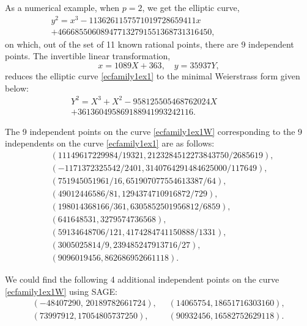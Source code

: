 \documentclass[11pt, leqno]{article}
\begin{document}
As a numerical example, when $p=2$, we get the elliptic curve,
\begin{multline}
y^2=x^3-1136261157571019728659411x\\
+466685506089477132791551368731316450,\quad \quad \quad \quad \quad \quad \label{ecfamily1ex1} 
\end{multline}
on which, out of the set of 11 known rational points,  there are 9 independent points. 
The invertible linear transformation,
\begin{equation}
x = 1089X+363,\quad  y = 35937Y,
\end{equation}
reduces the elliptic curve \eqref{ecfamily1ex1} to the minimal Weierstrass form given below:
\begin{multline}
Y^2=X^3+X^2-958125505468762024X\\
+361360495869188941993242116. \quad \quad \quad \quad \quad \quad  \label{ecfamily1ex1W}
\end{multline}

The 9 independent points on the curve \eqref{ecfamily1ex1W}  corresponding to  the  9 independents on the curve \eqref{ecfamily1ex1} are as follows:
\begin{equation}
\begin{aligned}
&(11149617229984/19321, 2123284512273843750/2685619), \\
&(-1171372325542/2401, 3140764291484625000/117649), \\
&(751945051961/16, 651907077554613387/64), \\
&(49012446586/81, 1294374710916872/729), \\
&(198014368166/361, 6305852501956812/6859), \\
&(641648531, 3279574736568), \\
&(59134648706/121, 4174284741150888/1331), \\
&(3005025814/9, 239485247913716/27), \\
&(9096019456, 862686952661118).
\end{aligned}
\label{ecfamily1ex1Wpoints1}
\end{equation}



We could find the following 4 additional  independent points on the curve \eqref{ecfamily1ex1W} using SAGE:
\begin{equation}
\begin{aligned} (-48407290, \,20189782661724),\;\;& (14065754, 18651716303160),\\
(73997912, 17054805737250),\;\;& (90932456, 16582752629118).\
\end{aligned} \label{ecfamily1ex1Wpoints2}
\end{equation}
\end{document}
